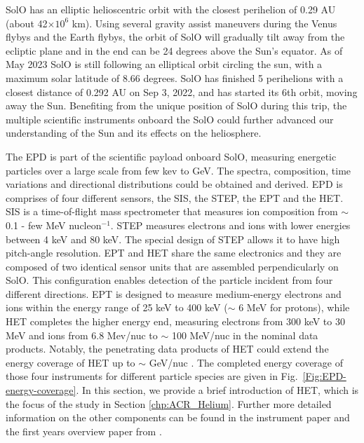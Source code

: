 
\ac{SolO} has an elliptic helioscentric orbit with the closest perihelion of 0.29 AU (about 42$\times10^6$ km). Using several gravity assist maneuvers during the Venus flybys and the Earth flybys, the orbit of \ac{SolO} will gradually tilt away from the ecliptic plane and in the end can be 24 degrees above the Sun's equator. As of May 2023 \ac{SolO} is still following an elliptical orbit circling the sun, with a maximum solar latitude of 8.66 degrees. \ac{SolO} has finished 5 perihelions with a closest distance of 0.292 AU on Sep 3, 2022, and has started its 6th orbit, moving away the Sun. Benefiting from the unique position of \ac{SolO} during this trip, the multiple scientific instruments onboard the \ac{SolO} could further advanced our understanding of the Sun and its effects on the heliosphere.

The \ac{EPD} \citep{RodriguezPacheco-2019-EPD} is part of the scientific payload onboard \ac{SolO}, measuring energetic particles over a large scale from few kev to GeV. The spectra, composition, time variations and directional distributions could be obtained and derived.
\ac{EPD} is comprises of four different sensors, the \ac{SIS}, the \ac{STEP}, the \ac{EPT} and the \ac{HET}. 
\ac{SIS} is a time-of-flight mass spectrometer that measures ion composition from $\sim$ 0.1 - few MeV nucleon$^{-1}$. \ac{STEP} measures electrons and ions with lower energies between 4 keV and 80 keV. The special design of \ac{STEP} allows it to have high pitch-angle resolution.
\ac{EPT} and \ac{HET} share the same electronics and they are composed of two identical sensor units that are assembled perpendicularly on \ac{SolO}. This configuration enables detection of the particle incident from four different directions. \ac{EPT} is designed to measure medium-energy electrons and ions within the energy range of 25 keV to 400 keV ($\sim$ 6 MeV for protons), while \ac{HET} completes the higher energy end, measuring electrons from 300 keV to 30 MeV and ions from 6.8 Mev/nuc to $\sim$ 100 MeV/nuc in the nominal data products. Notably, the penetrating data products of \ac{HET} could extend the energy coverage of \ac{HET} up to $\sim$ GeV/nuc \citep{Elftmann-2020-PhD}.
The completed energy coverage of those four instruments for different particle species are given in Fig.~\ref{Fig:EPD-energy-coverage}.
In this section, we provide a brief introduction of \ac{HET}, which is the focus of the study in Section \ref{chp:ACR_Helium}. Further more detailed information on the other components can be found in the instrument paper \citep{RodriguezPacheco-2019-EPD} and the first years overview paper from \citet{Wimmer2021AA}.


